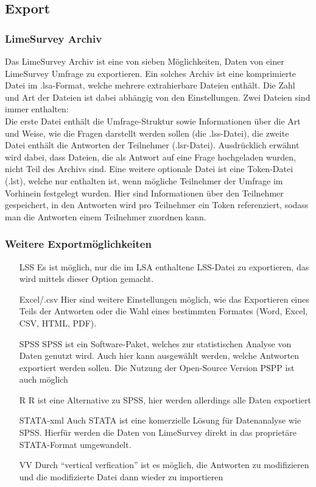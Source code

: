 \subsection{Export}
\subsubsection{LimeSurvey Archiv}
\label{m:lsa}
Das LimeSurvey Archiv ist eine von sieben Möglichkeiten, Daten von einer LimeSurvey Umfrage zu exportieren.
Ein solches Archiv ist eine komprimierte Datei im .lsa-Format, welche mehrere extrahierbare Dateien enthält.
Die Zahl und Art der Dateien ist dabei abhängig von den Einstellungen. Zwei Dateien sind immer enthalten:\\
Die erste Datei enthält die Umfrage-Struktur sowie Informationen über die Art und Weise, wie die Fragen darstellt werden sollen (die .lss-Datei), die zweite Datei enthält die Antworten der Teilnehmer (.lsr-Datei).
Ausdrücklich erwähnt wird dabei, dass Dateien, die als Antwort auf eine Frage hochgeladen wurden, nicht Teil des Archivs sind.
Eine weitere optionale Datei ist eine Token-Datei (.lst), welche nur enthalten ist, wenn mögliche Teilnehmer der Umfrage im Vorhinein festgelegt wurden.
Hier sind Informationen über den Teilnehmer gespeichert, in den Antworten wird pro Teilnehmer ein Token referenziert, sodass man die Antworten einem Teilnehmer zuordnen kann.

\subsubsection{Weitere Exportmöglichkeiten}
\begin{itemize}
	\item[LSS] Es ist möglich, nur die im LSA enthaltene LSS-Datei zu exportieren, das wird mittels dieser Option gemacht.
	\item[Excel/.csv] Hier sind weitere Einstellungen möglich, wie das Exportieren eines Teils der Antworten oder die Wahl eines bestimmten Formates (Word, Excel, CSV, HTML, PDF).
	\item[SPSS] SPSS ist ein Software-Paket, welches zur statistischen Analyse von Daten genutzt wird. Auch hier kann ausgewählt werden, welche Antworten exportiert werden sollen. Die Nutzung der Open-Source Version PSPP ist auch möglich
	\item[R] R ist eine Alternative zu SPSS, hier werden allerdings alle Daten exportiert
	\item[STATA-xml] Auch STATA ist eine komerzielle Lösung für Datenanalyse wie SPSS. Hierfür werden die Daten von LimeSurvey direkt in das proprietäre STATA-Format umgewandelt.
	\item[VV] Durch \enquote{vertical verfication} ist es möglich, die Antworten zu modifizieren und die modifizierte Datei dann wieder zu importieren
\end{itemize}

